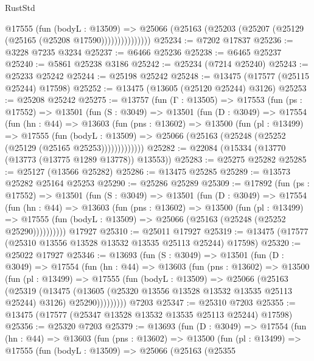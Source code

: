\begin{lexlean}{RustStd}
\begin{coremodule}
                  @17555
                    (fun (bodyL : @13509) =>
                    @25066 (@25163 (@25203 (@25207 (@25129 (@25165 (@25208 @17590)))))))))))))))
@25234 := @7202 @17837
@25236 := @3228 @7235 @3234
@25237 := @6466 @25236
@25238 := @6465 @25237
@25240 := @5861 @25238 @3186
@25242 := @25234 (@7214 @25240)
@25243 := @25233 @25242
@25244 := @25198 @25242
@25248 := @13475 (@17577 (@25115 @25244) @17598)
@25252 := @13475 (@13605 (@25120 @25244) @3126)
@25253 := @25208 @25242
@25275 := @13757
    (fun (Γ : @13505) =>
    @17553
      (fun (ps : @17552) =>
      @13501
        (fun (S : @3049) =>
        @13501
          (fun (D : @3049) =>
          @17554
            (fun (hn : @44) =>
            @13603
              (fun (pns : @13602) =>
              @13500
                (fun (pl : @13499) =>
                @17555
                  (fun (bodyL : @13509) =>
                  @25066 (@25163 (@25248 (@25252 (@25129 (@25165 @25253)))))))))))))
@25282 := @22084 (@15334 (@13770 (@13773 (@13775 @1289 @13778)) @13553))
@25283 := @25275 @25282
@25285 := @25127 (@13566 @25282)
@25286 := @13475 @25285
@25289 := @13573 @25282 @25164 @25253
@25290 := @25286 @25289
@25309 := @17892
    (fun (ps : @17552) =>
    @13501
      (fun (S : @3049) =>
      @13501
        (fun (D : @3049) =>
        @17554
          (fun (hn : @44) =>
          @13603
            (fun (pns : @13602) =>
            @13500
              (fun (pl : @13499) =>
              @17555 (fun (bodyL : @13509) => @25066 (@25163 (@25248 (@25252 @25290))))))))))
    @17927
@25310 := @25011 @17927
@25319 := @13475 (@17577 (@25310 @13556 @13528 @13532 @13535 @25113 @25244) @17598)
@25320 := @25022 @17927
@25346 := @13693
    (fun (S : @3049) =>
    @13501
      (fun (D : @3049) =>
      @17554
        (fun (hn : @44) =>
        @13603
          (fun (pns : @13602) =>
          @13500
            (fun (pl : @13499) =>
            @17555
              (fun (bodyL : @13509) =>
              @25066
                (@25163
                  (@25319
                    (@13475
                      (@13605 (@25320 @13556 @13528 @13532 @13535 @25113 @25244) @3126)
                      @25290)))))))))
    @7203
@25347 := @25310 @7203
@25355 := @13475 (@17577 (@25347 @13528 @13532 @13535 @25113 @25244) @17598)
@25356 := @25320 @7203
@25379 := @13693
    (fun (D : @3049) =>
    @17554
      (fun (hn : @44) =>
      @13603
        (fun (pns : @13602) =>
        @13500
          (fun (pl : @13499) =>
          @17555
            (fun (bodyL : @13509) =>
            @25066
              (@25163
                (@25355

\end{coremodule}
\end{lexlean}
